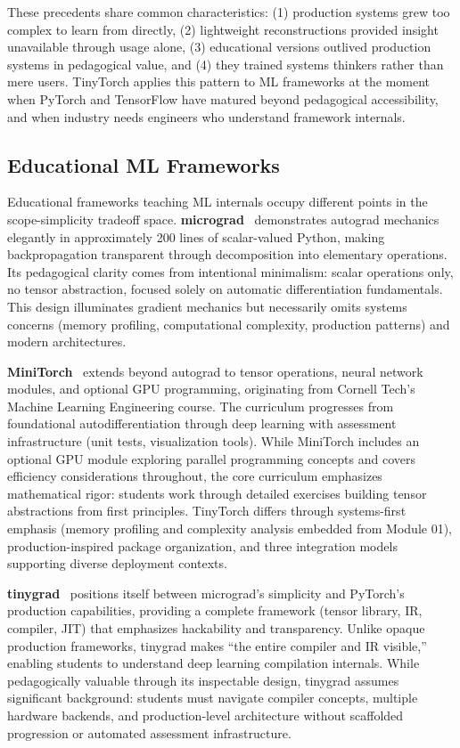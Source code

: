 \documentclass[10pt,twocolumn]{article}
\begin{document}
These precedents share common characteristics: (1) production systems grew too complex to learn from directly, (2) lightweight reconstructions provided insight unavailable through usage alone, (3) educational versions outlived production systems in pedagogical value, and (4) they trained systems thinkers rather than mere users. TinyTorch applies this pattern to ML frameworks at the moment when PyTorch and TensorFlow have matured beyond pedagogical accessibility, and when industry needs engineers who understand framework internals.

\subsection{Educational ML Frameworks}

Educational frameworks teaching ML internals occupy different points in the scope-simplicity tradeoff space. \textbf{micrograd}~\citep{karpathy2022micrograd} demonstrates autograd mechanics elegantly in approximately 200 lines of scalar-valued Python, making backpropagation transparent through decomposition into elementary operations. Its pedagogical clarity comes from intentional minimalism: scalar operations only, no tensor abstraction, focused solely on automatic differentiation fundamentals. This design illuminates gradient mechanics but necessarily omits systems concerns (memory profiling, computational complexity, production patterns) and modern architectures.

\textbf{MiniTorch}~\citep{rush2020minitorch} extends beyond autograd to tensor operations, neural network modules, and optional GPU programming, originating from Cornell Tech's Machine Learning Engineering course. The curriculum progresses from foundational autodifferentiation through deep learning with assessment infrastructure (unit tests, visualization tools). While MiniTorch includes an optional GPU module exploring parallel programming concepts and covers efficiency considerations throughout, the core curriculum emphasizes mathematical rigor: students work through detailed exercises building tensor abstractions from first principles. TinyTorch differs through systems-first emphasis (memory profiling and complexity analysis embedded from Module 01), production-inspired package organization, and three integration models supporting diverse deployment contexts.

\textbf{tinygrad}~\citep{hotz2023tinygrad} positions itself between micrograd's simplicity and PyTorch's production capabilities, providing a complete framework (tensor library, IR, compiler, JIT) that emphasizes hackability and transparency. Unlike opaque production frameworks, tinygrad makes ``the entire compiler and IR visible,'' enabling students to understand deep learning compilation internals. While pedagogically valuable through its inspectable design, tinygrad assumes significant background: students must navigate compiler concepts, multiple hardware backends, and production-level architecture without scaffolded progression or automated assessment infrastructure.
\end{document}
